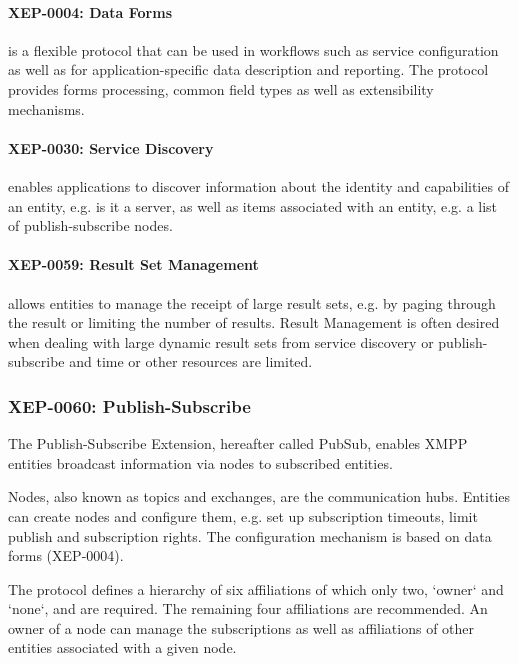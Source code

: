 \paragraph{XEP-0004: Data Forms} is a flexible protocol that can be used in workflows such as service configuration as well as for application-specific data description and reporting. The protocol provides forms processing, common field types as well as extensibility mechanisms. \cite{xep-0004} 

\paragraph{XEP-0030: Service Discovery} enables applications to discover information about the identity and capabilities of an entity, e.g. is it a server, as well as items associated with an entity, e.g. a list of publish-subscribe nodes. \cite{xep-0030}

\paragraph{XEP-0059: Result Set Management} allows entities to manage the receipt of large result sets, e.g. by paging through the result or limiting the number of results. Result Management is often desired when dealing with large dynamic result sets from service discovery or publish-subscribe and time or other resources are limited. \cite{xep-0059} 

\subsubsection{XEP-0060: Publish-Subscribe}

The Publish-Subscribe Extension, hereafter called PubSub, enables XMPP entities broadcast information via nodes to subscribed entities. \cite{xep-0060}

Nodes, also known as topics and exchanges, are the communication hubs. Entities can create nodes and configure them, e.g. set up subscription timeouts, limit publish and subscription rights. The configuration mechanism is based on data forms (XEP-0004).

The protocol defines a hierarchy of six affiliations of which only two, `owner` and `none`, and are required. The remaining four affiliations are recommended. An owner of a node can manage the subscriptions as well as affiliations of other entities associated with a given node. %

